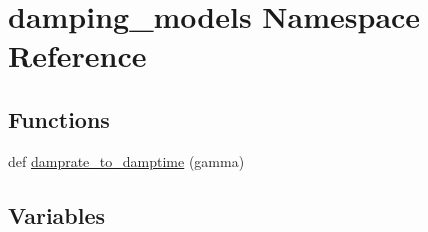 \hypertarget{namespacedamping__models}{}\section{damping\+\_\+models Namespace Reference}
\label{namespacedamping__models}
\subsection*{Functions}
\begin{DoxyCompactItemize}
\item 
def \hyperlink{namespacedamping__models_a6c45de9ee4907b632137bd3968434c8f}{damprate\+\_\+to\+\_\+damptime} (gamma)
\end{DoxyCompactItemize}
\subsection*{Variables}

